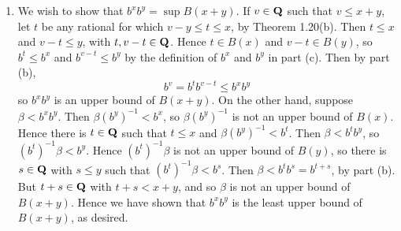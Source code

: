 \begin{ex}
\begin{enumerate}
[TODO]

\item We wish to show that $b^xb^y = \sup B(x + y)$. If $v \in \mathbf{Q}$ such that $v \leq x + y$, let $t$ be any rational for which $v - y \leq t \leq x$, by Theorem 1.20(b). Then $t \leq x$ and $v-t \leq y$, with $t, v - t \in \mathbf{Q}$. Hence $t \in B(x)$ and $v-t \in B(y)$, so $b^t \leq b^x$ and $b^{v-t} \leq b^y$ by the definition of $b^x$ and $b^y$ in part (c). Then by part (b), \[b^v = b^tb^{v-t} \leq b^xb^y\] so $b^xb^y$ is an upper bound of $B(x + y)$. On the other hand, suppose $\beta < b^xb^y$. Then $\beta(b^y)^{-1} < b^x$, so $\beta(b^y)^{-1}$ is not an upper bound of $B(x)$. Hence there is $t \in \mathbf{Q}$ such that $t \leq x$ and $\beta(b^y)^{-1} < b^t$. Then $\beta < b^tb^y$, so $(b^t)^{-1}\beta < b^y$. Hence $(b^t)^{-1}\beta$ is not an upper bound of $B(y)$, so there is $s \in \mathbf{Q}$ with $s \leq y$ such that $(b^t)^{-1}\beta < b^s$. Then $\beta < b^tb^s = b^{t+s}$, by part (b). But $t + s \in \mathbf{Q}$ with $t + s < x + y$, and so $\beta$ is not an upper bound of $B(x + y)$. Hence we have shown that $b^xb^y$ is the least upper bound of $B(x+y)$, as desired.
\end{enumerate}
\end{ex}

